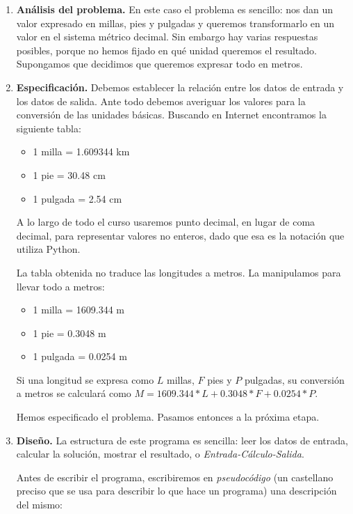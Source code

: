 \begin{enumerate}
\item {\bf Análisis del problema.} En este caso el problema es
sencillo: nos dan un valor expresado en millas, pies y pulgadas y
queremos transformarlo en un valor en el sistema métrico decimal.
Sin embargo hay varias respuestas posibles, porque no hemos fijado
en qué unidad queremos el resultado. Supongamos que decidimos que
queremos expresar todo en metros.

\item {\bf Especificación.} Debemos establecer la relación entre
los datos de entrada y los datos de salida. Ante todo debemos
averiguar los valores para la conversión de las unidades básicas.
Buscando en Internet encontramos la siguiente tabla:

\begin{itemize}
\item 1 milla = 1.609344 km
\item 1 pie = 30.48 cm
\item 1 pulgada = 2.54 cm
\end{itemize}

\begin{atencion}
A lo largo de todo el curso usaremos punto decimal,
en lugar de coma decimal, para representar valores no enteros,
dado que esa es la notación que utiliza Python.
\end{atencion}

La tabla obtenida no traduce las longitudes a metros. La manipulamos para
llevar todo a metros:

\begin{itemize}
\item 1 milla = 1609.344 m
\item 1 pie = 0.3048 m
\item 1 pulgada = 0.0254 m
\end{itemize}

Si una longitud se expresa como $L$ millas, $F$ pies y $P$ pulgadas, su
conversión a metros se calculará como
$M = 1609.344 * L + 0.3048 * F + 0.0254 * P.$

Hemos especificado el problema. Pasamos entonces a la próxima etapa.

\item {\bf Diseño.} La estructura de este programa es sencilla:
leer los datos de entrada, calcular la solución, mostrar el
resultado, o {\it Entrada-Cálculo-Salida}.

Antes de escribir el programa, escribiremos en {\it pseudocódigo}
(un castellano preciso que se usa para describir lo que hace un
programa) una descripción del mismo:


\end{enumerate}
